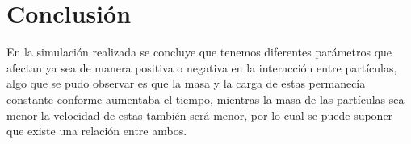 \documentclass{article}
\begin{document}
\section{Conclusi\'{o}n}\label{con}

En la simulaci\'on realizada se concluye que tenemos diferentes par\'ametros que afectan ya sea de manera positiva o negativa en la interacci\'on entre part\'iculas, algo que se pudo observar es que la masa y la carga de estas permanec\'ia constante conforme aumentaba el tiempo, mientras la masa de las part\'iculas sea menor la velocidad de estas tambi\'en ser\'a menor, por lo cual se puede suponer que existe una relaci\'on entre ambos.


  
  
\end{document}
